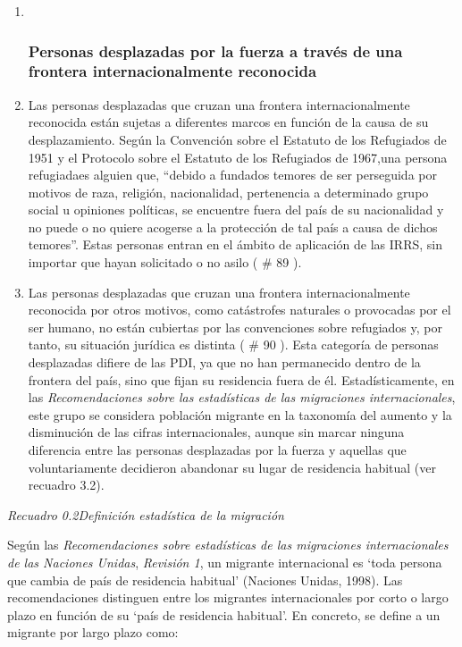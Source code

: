 \documentclass[
]{book}
\begin{document}
\begin{enumerate}
\def\labelenumi{\arabic{enumi}.}
\item ~
  \hypertarget{personas-desplazadas-por-la-fuerza-a-travuxe9s-de-una-frontera-internacionalmente-reconocida}{%
  \subsubsection{Personas desplazadas por la fuerza a través de una frontera internacionalmente reconocida}\label{personas-desplazadas-por-la-fuerza-a-travuxe9s-de-una-frontera-internacionalmente-reconocida}}
\item
  Las personas desplazadas que cruzan una frontera internacionalmente reconocida están sujetas a diferentes marcos en función de la causa de su desplazamiento. Según la Convención sobre el Estatuto de los Refugiados de 1951 y el Protocolo sobre el Estatuto de los Refugiados de 1967,una persona refugiadaes alguien que, ``debido a fundados temores de ser perseguida por motivos de raza, religión, nacionalidad, pertenencia a determinado grupo social u opiniones políticas, se encuentre fuera del país de su nacionalidad y no puede o no quiere acogerse a la protección de tal país a causa de dichos temores''. Estas personas entran en el ámbito de aplicación de las IRRS, sin importar que hayan solicitado o no asilo (
  \# 89
  ).
\item
  Las personas desplazadas que cruzan una frontera internacionalmente reconocida por otros motivos, como catástrofes naturales o provocadas por el ser humano, no están cubiertas por las convenciones sobre refugiados y, por tanto, su situación jurídica es distinta (
  \# 90
  ). Esta categoría de personas desplazadas difiere de las PDI, ya que no han permanecido dentro de la frontera del país, sino que fijan su residencia fuera de él. Estadísticamente, en las \emph{Recomendaciones sobre las estadísticas de las migraciones internacionales}, este grupo se considera población migrante en la taxonomía del aumento y la disminución de las cifras internacionales, aunque sin marcar ninguna diferencia entre las personas desplazadas por la fuerza y aquellas que voluntariamente decidieron abandonar su lugar de residencia habitual (ver recuadro 3.2).
\end{enumerate}

\emph{Recuadro 0.2Definición estadística de la migración}

Según las \emph{Recomendaciones sobre estadísticas de las migraciones internacionales de las Naciones Unidas}, \emph{Revisión 1}, un migrante internacional es `toda persona que cambia de país de residencia habitual' (Naciones Unidas, 1998). Las recomendaciones distinguen entre los migrantes internacionales por corto o largo plazo en función de su `país de residencia habitual'. En concreto, se define a un migrante por largo plazo como:
\end{document}
